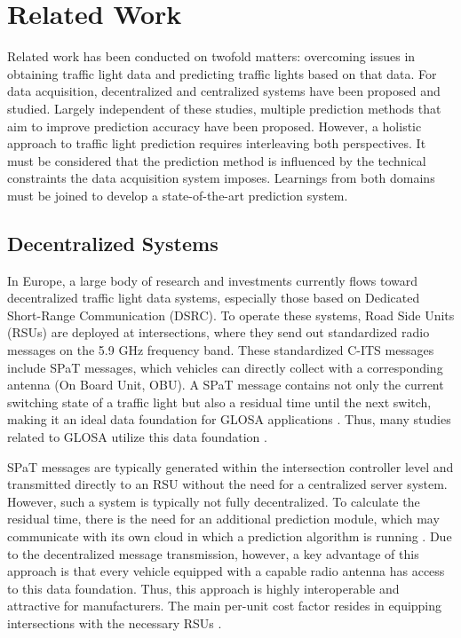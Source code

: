 \section{Related Work}

Related work has been conducted on twofold matters: overcoming issues in obtaining traffic light data and predicting traffic lights based on that data. For data acquisition, decentralized and centralized systems have been proposed and studied. Largely independent of these studies, multiple prediction methods that aim to improve prediction accuracy have been proposed. However, a holistic approach to traffic light prediction requires interleaving both perspectives. It must be considered that the prediction method is influenced by the technical constraints the data acquisition system imposes. Learnings from both domains must be joined to develop a state-of-the-art prediction system.

\subsection{Decentralized Systems}

In Europe, a large body of research and investments currently flows toward decentralized traffic light data systems, especially those based on Dedicated Short-Range Communication (DSRC). To operate these systems, Road Side Units (RSUs) are deployed at intersections, where they send out standardized radio messages on the 5.9 GHz frequency band. These standardized C-ITS messages include SPaT messages, which vehicles can directly collect with a corresponding antenna (On Board Unit, OBU). A SPaT message contains not only the current switching state of a traffic light but also a residual time until the next switch, making it an ideal data foundation for GLOSA applications \cite{ibrahim_estimating_2019}. Thus, many studies related to GLOSA utilize this data foundation \cite{schweiger_elisatm_2011, rakha_eco-driving_2011, rakha_aeris_2012, li_open_2012, suramardhana_driver-centric_2014, xu_bb_2015, bernais_design_2016, nguyen_efficient_2016, choudhury_integrated_2016, stahlmann_multi-hop_2017, stahlmann_exploring_2018, plianos_predictive_2018, zhang_green_2020, chen_developing_2022}.

SPaT messages are typically generated within the intersection controller level \cite{zweck_traffic_2013} and transmitted directly to an RSU without the need for a centralized server system. However, such a system is typically not fully decentralized. To calculate the residual time, there is the need for an additional prediction module, which may communicate with its own cloud in which a prediction algorithm is running \cite{strobl_c-its_2019, neuner_leitfaden_2020}. Due to the decentralized message transmission, however, a key advantage of this approach is that every vehicle equipped with a capable radio antenna has access to this data foundation. Thus, this approach is highly interoperable and attractive for manufacturers. The main per-unit cost factor resides in equipping intersections with the necessary RSUs \cite{niebel_cost-benefit-based_2013}.

